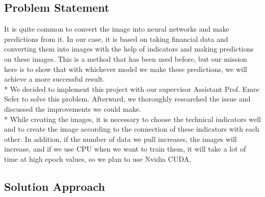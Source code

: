 \documentclass{article}
\begin{document}
\begin{center}
    \item\section{Problem Statement}
\end{center}
It is quite common to convert the image into neural networks and make predictions from it. In our case, it is based on taking financial data and converting them into images with the help of indicators and making predictions on these images. This is a method that has been used before, but our mission here is to show that with whichever model we make these predictions, we will achieve a more successful result. \vspace{0.2cm}\\*
We decided to implement this project with our supervisor Assistant Prof. Emre Sefer to solve this problem. Afterward, we thoroughly researched the issue and discussed the improvements we could make. \vspace{0.0005cm}\\*
While creating the images, it is necessary to choose the technical indicators well and to create the image according to the connection of these indicators with each other. In addition, if the number of data we pull increases, the images will increase, and if we use CPU when we want to train them, it will take a lot of time at high epoch values, so we plan to use Nvidia CUDA.

\begin{center}
    \item\section{Solution Approach}
\end{center}
\end{document}
